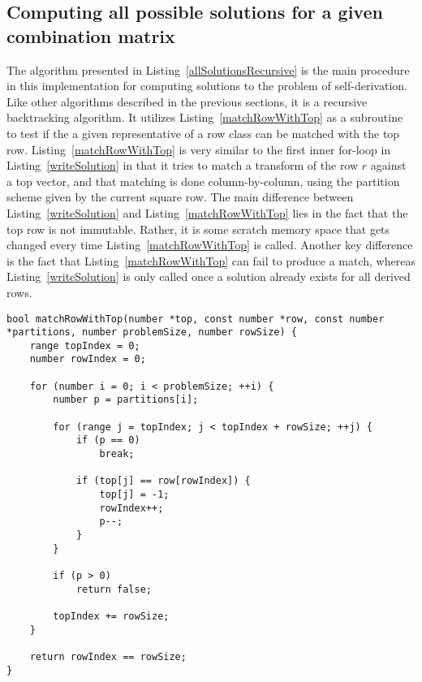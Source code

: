 \subsection{Computing all possible solutions for a given combination matrix}

The algorithm presented in Listing~\ref{allSolutionsRecursive} is the main procedure in this implementation for computing solutions to the problem of self-derivation. Like other algorithms described in the previous sections, it is a recursive backtracking algorithm. It utilizes Listing~\ref{matchRowWithTop} as a subroutine to test if the a given representative of a row class can be matched with the top row. Listing~\ref{matchRowWithTop} is very similar to the first inner for-loop in Listing~\ref{writeSolution} in that it tries to match a transform of the row $r$ against a top vector, and that matching is done column-by-column, using the partition scheme given by the current square row. The main difference between Listing~\ref{writeSolution} and Listing~\ref{matchRowWithTop} lies in the fact that the top row is not immutable. Rather, it is some scratch memory space that gets changed every time Listing~\ref{matchRowWithTop} is called. Another key difference is the fact that Listing~\ref{matchRowWithTop} can fail to produce a match, whereas Listing~\ref{writeSolution} is only called once a solution already exists for all derived rows.

\begin{lstlisting}[caption={Matching a representative of a row class with a given top vector.},label={matchRowWithTop}]
bool matchRowWithTop(number *top, const number *row, const number *partitions, number problemSize, number rowSize) {
    range topIndex = 0;
    number rowIndex = 0;

    for (number i = 0; i < problemSize; ++i) {
        number p = partitions[i];

        for (range j = topIndex; j < topIndex + rowSize; ++j) {
            if (p == 0)
                break;

            if (top[j] == row[rowIndex]) {
                top[j] = -1;
                rowIndex++;
                p--;
            }
        }

        if (p > 0)
            return false;

        topIndex += rowSize;
    }

    return rowIndex == rowSize;
}
\end{lstlisting}

